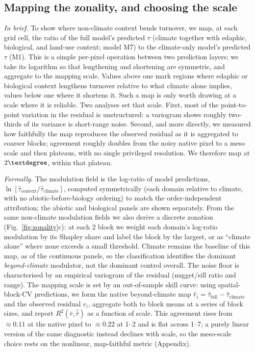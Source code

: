 \documentclass[12pt, a4paper]{article}
\begin{document}
\subsection{Mapping the zonality, and choosing the scale}
\label{sec:mapscale}
\textit{In brief.} To show where non-climate context bends turnover, we map, at
each grid cell, the ratio of the full model's predicted $\tau$ (climate together
with edaphic, biological, and land-use context; model M7) to the climate-only
model's predicted $\tau$ (M1). This is a simple per-pixel operation between two
prediction layers; we take its logarithm so that lengthening and shortening are
symmetric, and aggregate to the mapping scale. Values above
one mark regions where edaphic or biological context lengthens turnover relative to
what climate alone implies, values below one where it shortens it. Such a map is
only worth drawing at a scale where it is reliable. Two analyses set that scale.
First, most of the point-to-point variation in the residual is unstructured: a
variogram shows roughly two-thirds of its variance is short-range noise. Second,
and more directly, we measured how faithfully the map reproduces the observed
residual as it is aggregated to coarser blocks; agreement roughly doubles from the
noisy native pixel to a meso scale and then plateaus, with no single privileged
resolution. We therefore map at $2\textdegree$, within that plateau.

\textit{Formally.} The modulation field is the log-ratio of model predictions,
$\ln[\hat\tau_{\text{context}}/\hat\tau_{\text{climate}}]$, computed symmetrically
(each domain relative to climate, with no abiotic-before-biology ordering) to match
the order-independent attribution; the abiotic and biological panels are shown
separately. From the same non-climate modulation fields we also derive a discrete
zonation (Fig.~\ref{fig:zonality}c): at each 2\textdegree{} block we weight each
domain's log-ratio modulation by its Shapley share and label the block by the
largest, or as ``climate alone'' where none exceeds a small threshold. Climate
remains the baseline of this map, as of the continuous panels, so the
classification identifies the dominant \emph{beyond-climate} modulator, not the
dominant control overall. The noise floor is characterised by an empirical variogram of the
residual (nugget/sill ratio and range). The mapping scale is set by an
out-of-sample skill curve: using spatial-block-CV predictions, we form the native
beyond-climate map $\hat r_i=\hat\tau_{\text{full}}-\hat\tau_{\text{climate}}$ and
the observed residual $r_i$, aggregate both to block means at a series of block
sizes, and report $R^2(\bar r,\hat{\bar r})$ as a function of scale. This agreement
rises from $\approx0.11$ at the native pixel to $\approx0.22$ at
1--2\textdegree{} and is flat across 1--7\textdegree; a purely linear version of the
same diagnostic instead declines with scale, so the meso-scale choice rests on the
nonlinear, map-faithful metric (Appendix).
\end{document}
